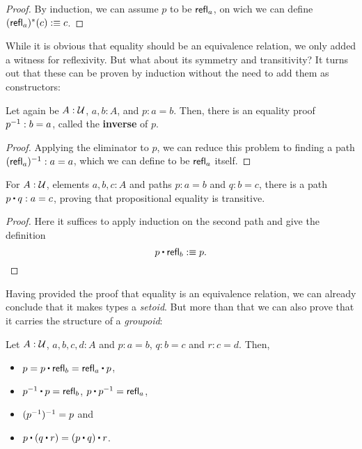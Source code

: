 \begin{proof}
By induction, we can assume $p$ to be $\mathsf{refl}_a$, on wich we can define
$(\mathsf{refl}_a)^*(c) :\equiv c$.
\end{proof}

While it is obvious that equality should be an equivalence relation,
we only added a witness for reflexivity.
But what about its symmetry and transitivity?
It turns out that these can be proven by induction without the need
to add them as constructors:
\begin{lemma}
Let again be $A : \mathcal{U}$, $a, b : A$, and $p : a = b$.
Then, there is an equality proof $p^{-1} : b = a$, called the \textbf{inverse}
of $p$.
\end{lemma}

\begin{proof}
Applying the eliminator to $p$, we can reduce this problem to finding a path
$(\mathsf{refl}_a)^{-1} : a = a$, which we can define to be $\mathsf{refl}_a$ itself.
\end{proof}

\begin{lemma}
For $A : \mathcal{U}$, elements $a, b, c : A$ and paths $p : a = b$ and $q : b = c$,
there is a path $p \ct q : a = c$, proving that propositional equality is
transitive.
\end{lemma}

\begin{proof}
Here it suffices to apply induction on the second path and give the definition
\begin{equation*}
p \ct \refl_b :\equiv p \text{.}
\end{equation*}
\end{proof}

Having provided the proof that equality is an equivalence relation,
we can already conclude that it makes types a \emph{setoid}.
But more than that we can also prove that it carries the structure of a
\emph{groupoid}:
\begin{lemma}
Let $A : \mathcal{U}$, $a, b, c, d : A$ and $p : a = b$, $q : b = c$ and $r : c = d$.
Then,
\begin{itemize}
\item $p = p \ct \refl_b = \refl_a \ct p$,
\item $p\inv \ct p = \refl_b$, $p \ct p\inv = \refl_a$,
\item $(p^{-1})^{-1} = p$ and
\item $p \ct (q \ct r) = (p \ct q) \ct r$.
\end{itemize}
\end{lemma}

